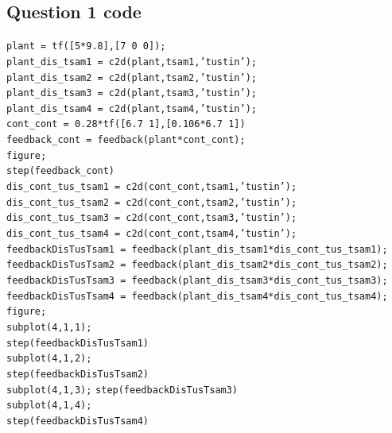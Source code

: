 \documentclass[a4paper, 12pt]{article}
\begin{document}
\begin{appendices}
  \section{Question 1 code}
  \label{sec:appendix_1}
  \noindent
  \texttt{plant = tf([5*9.8],[7 0 0]);}\\
  \texttt{plant\_dis\_tsam1 = c2d(plant,tsam1,'tustin');}\\
  \texttt{plant\_dis\_tsam2 = c2d(plant,tsam2,'tustin');}\\
  \texttt{plant\_dis\_tsam3 = c2d(plant,tsam3,'tustin');}\\
  \texttt{plant\_dis\_tsam4 = c2d(plant,tsam4,'tustin');}\\

  \noindent
  \texttt{cont\_cont = 0.28*tf([6.7 1],[0.106*6.7 1])}\\
  
  \noindent
  \texttt{feedback\_cont = feedback(plant*cont\_cont);}\\
  \texttt{figure;}\\
  \texttt{step(feedback\_cont)}\\
  
  \noindent
  \texttt{dis\_cont\_tus\_tsam1 = c2d(cont\_cont,tsam1,'tustin');}\\
  \texttt{dis\_cont\_tus\_tsam2 = c2d(cont\_cont,tsam2,'tustin');}\\
  \texttt{dis\_cont\_tus\_tsam3 = c2d(cont\_cont,tsam3,'tustin');}\\
  \texttt{dis\_cont\_tus\_tsam4 = c2d(cont\_cont,tsam4,'tustin');}\\
  
  \noindent
  \texttt{feedbackDisTusTsam1 = feedback(plant\_dis\_tsam1*dis\_cont\_tus\_tsam1);}\\
  \texttt{feedbackDisTusTsam2 = feedback(plant\_dis\_tsam2*dis\_cont\_tus\_tsam2);}\\
  \texttt{feedbackDisTusTsam3 = feedback(plant\_dis\_tsam3*dis\_cont\_tus\_tsam3);}\\
  \texttt{feedbackDisTusTsam4 = feedback(plant\_dis\_tsam4*dis\_cont\_tus\_tsam4);}\\
  
  \noindent
  \texttt{figure;}\\
  \texttt{subplot(4,1,1);}\\
  \texttt{step(feedbackDisTusTsam1)}\\
  \texttt{subplot(4,1,2);}\\
  \texttt{step(feedbackDisTusTsam2)}\\
  \texttt{subplot(4,1,3);}
  \texttt{step(feedbackDisTusTsam3)}\\
  \texttt{subplot(4,1,4);}\\
  \texttt{step(feedbackDisTusTsam4)}\\


\end{appendices}
\end{document}

